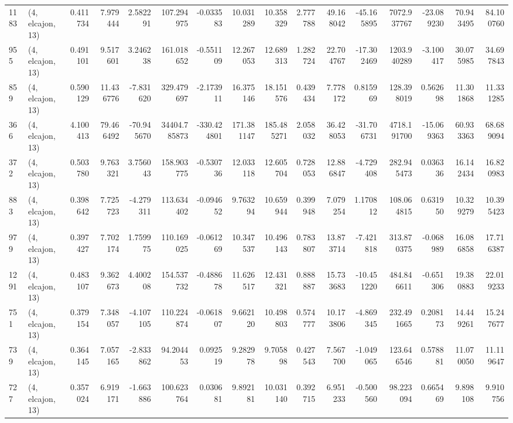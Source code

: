 \begin{tabular}{llrrrrrrrrrrrrrr}
1183 &  (4, elcajon, 13) &   0.411734 &   7.979444 &   2.582291 &    107.294975 &   -0.033583 &   10.031289 &   10.358329 &  2.777788 &  49.168042 & -45.165895 &  7072.937767 & -23.089230 &  70.943495 &  84.100760 \\
955  &  (4, elcajon, 13) &   0.491101 &   9.517601 &   3.246238 &    161.018652 &   -0.551109 &   12.267053 &   12.689313 &  1.282724 &  22.704767 & -17.302469 &  1203.940289 &  -3.100417 &  30.075985 &  34.697843 \\
859  &  (4, elcajon, 13) &   0.590129 &  11.436776 &  -7.831620 &    329.479697 &   -2.173911 &   16.375146 &   18.151576 &  0.439434 &   7.778172 &   0.815969 &   128.398019 &   0.562698 &  11.301868 &  11.331285 \\
366  &  (4, elcajon, 13) &   4.100413 &  79.466492 & -70.945670 &  34404.785873 & -330.424801 &  171.381147 &  185.485271 &  2.058032 &  36.428053 & -31.706731 &  4718.191700 & -15.069363 &  60.933363 &  68.689094 \\
372  &  (4, elcajon, 13) &   0.503780 &   9.763321 &   3.756043 &    158.903775 &   -0.530736 &   12.033118 &   12.605704 &  0.728053 &  12.886847 &  -4.729408 &   282.945473 &   0.036336 &  16.142434 &  16.820983 \\
883  &  (4, elcajon, 13) &   0.398642 &   7.725723 &  -4.279311 &    113.634402 &   -0.094652 &    9.763294 &   10.659944 &  0.399948 &   7.079254 &   1.170812 &   108.064815 &   0.631950 &  10.329279 &  10.395423 \\
979  &  (4, elcajon, 13) &   0.397427 &   7.702174 &   1.759975 &    110.169025 &   -0.061269 &   10.347537 &   10.496143 &  0.783807 &  13.873714 &  -7.421818 &   313.870375 &  -0.068989 &  16.086858 &  17.716387 \\
1291 &  (4, elcajon, 13) &   0.483107 &   9.362673 &   4.400208 &    154.537732 &   -0.488678 &   11.626517 &   12.431321 &  0.888887 &  15.733683 & -10.451220 &   484.846611 &  -0.651306 &  19.380883 &  22.019233 \\
751  &  (4, elcajon, 13) &   0.379154 &   7.348057 &  -4.107105 &    110.224874 &   -0.061807 &    9.662120 &   10.498803 &  0.574777 &  10.173806 &  -4.869345 &   232.491665 &   0.208173 &  14.449261 &  15.247677 \\
739  &  (4, elcajon, 13) &   0.364145 &   7.057165 &  -2.833862 &     94.204453 &    0.092519 &    9.282978 &    9.705898 &  0.427543 &   7.567700 &  -1.049065 &   123.646546 &   0.578881 &  11.070050 &  11.119647 \\
727  &  (4, elcajon, 13) &   0.357024 &   6.919171 &  -1.663886 &    100.623764 &    0.030681 &    9.892181 &   10.031140 &  0.392715 &   6.951233 &  -0.500560 &    98.223094 &   0.665469 &   9.898108 &   9.910756 \\

\end{tabular}
